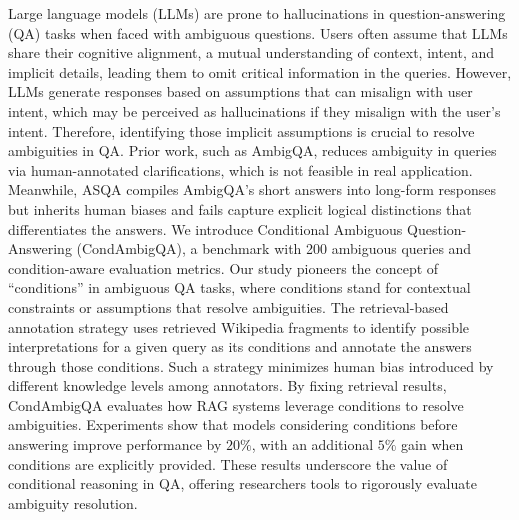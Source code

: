 Large language models (LLMs) are prone to hallucinations in question-answering (QA) tasks when faced with ambiguous questions. Users often assume that LLMs share their cognitive alignment, a mutual understanding of context, intent, and implicit details, leading them to omit critical information in the queries. However, LLMs generate responses based on assumptions that can misalign with user intent, which may be perceived as hallucinations if they misalign with the user's intent. Therefore, identifying those implicit assumptions is crucial to resolve ambiguities in QA. Prior work, such as AmbigQA, reduces ambiguity in queries via human-annotated clarifications, which is not feasible in real application. Meanwhile, ASQA compiles AmbigQA's short answers into long-form responses but inherits human biases and fails capture explicit logical distinctions that differentiates the answers. We introduce Conditional Ambiguous Question-Answering (CondAmbigQA), a benchmark with 200 ambiguous queries and condition-aware evaluation metrics. Our study pioneers the concept of ``conditions'' in ambiguous QA tasks, where conditions stand for contextual constraints or assumptions that resolve ambiguities. The retrieval-based annotation strategy uses retrieved Wikipedia fragments to identify possible interpretations for a given query as its conditions and annotate the answers through those conditions. Such a strategy minimizes human bias introduced by different knowledge levels among annotators. By fixing retrieval results, CondAmbigQA evaluates how RAG systems leverage conditions to resolve ambiguities. Experiments show that models considering conditions before answering improve performance by $20\%$, with an additional $5\%$ gain when conditions are explicitly provided. These results underscore the value of conditional reasoning in QA, offering researchers tools to rigorously evaluate ambiguity resolution.